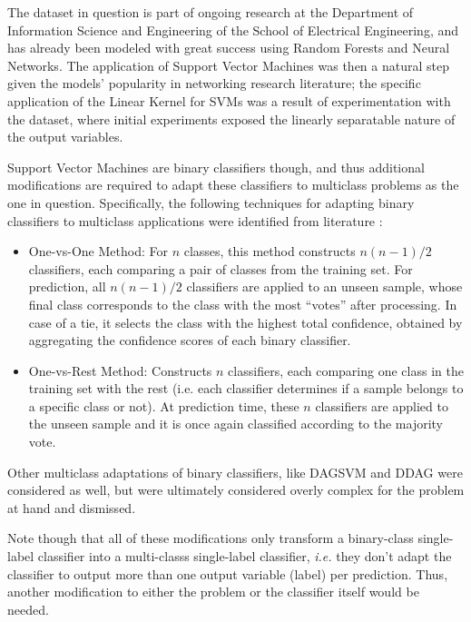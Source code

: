 \documentclass{kthreport}
\theoremstyle{definition}
\begin{document}
The dataset in question is part of ongoing research at the Department of Information Science and Engineering of the School of Electrical Engineering, and has already been modeled with great success using Random Forests and Neural Networks. The application of Support Vector Machines was then a natural step given the models' popularity in networking research literature; the specific application of the Linear Kernel for SVMs was a result of experimentation with the dataset, where initial experiments exposed the linearly separatable nature of the output variables.

Support Vector Machines are binary classifiers though, and thus additional modifications are required to adapt these classifiers to multiclass problems as the one in question. Specifically, the following techniques for adapting binary classifiers to multiclass applications were identified from literature \autocite{hsu2002comparison,tax2002multiclass}:

\begin{itemize}
	\item One-vs-One Method: For $n$ classes, this method constructs $n(n-1)/2$ classifiers, each comparing a pair of classes from the training set. For prediction, all $n(n-1)/2$ classifiers are applied to an unseen sample, whose final class corresponds to the class with the most ``votes'' after processing. In case of a tie, it selects the class with the highest total confidence, obtained by aggregating the confidence scores of each binary classifier.
	\item One-vs-Rest Method: Constructs $n$ classifiers, each comparing one class in the training set with the rest (i.e. each classifier determines if a sample belongs to a specific class or not). At prediction time, these $n$ classifiers are applied to the unseen sample and it is once again classified according to the majority vote.
\end{itemize}

Other multiclass adaptations of binary classifiers, like DAGSVM \autocite{chen2009dagsvm} and DDAG \autocite{platt2000ddag} were considered as well, but were ultimately considered overly complex for the problem at hand and dismissed.

Note though that all of these modifications only transform a binary-class single-label classifier into a multi-classs single-label classifier, \emph{i.e.} they don't adapt the classifier to output more than one output variable (label) per prediction.
Thus, another modification to either the problem or the classifier itself would be needed.
\end{document}
